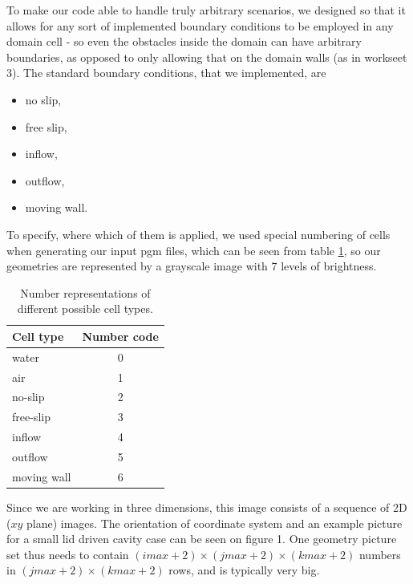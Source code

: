 \documentclass[a4paper, 12pt]{article}
\begin{document}
To make our code able to handle truly arbitrary scenarios, we designed so that it allows for any sort of implemented boundary conditions to be employed in any
domain cell - so even the obstacles inside the domain can have arbitrary boundaries, as opposed to only allowing that on the domain walls (as in workseet 3).
The standard boundary conditions, that we implemented, are
\begin{itemize}
\item no slip,
\item free slip,
\item inflow,
\item outflow,
\item moving wall.
\end{itemize}
To specify, where which of them is applied, we used special numbering of cells when generating our input pgm files, which can be seen from table
\ref{tab1}, so our geometries are represented by a grayscale image with 7 levels of brightness.
\begin{table}[hb!]
\centering
\label{tab1}
\begin{tabular}{|l|c|}
\hline
{\bf Cell type} & {\bf Number code}\\
\hline
water & 0 \\
air & 1 \\
no-slip & 2 \\
free-slip & 3 \\
inflow & 4 \\
outflow & 5 \\
moving wall & 6 \\
\hline
\end{tabular}
\caption{Number representations of different possible cell types.}
\end{table}
Since we are working in three dimensions, this image consists of a sequence of 2D ($xy$ plane) images. The orientation of coordinate system and an
example picture for a small lid driven cavity case can be seen on figure 1. One geometry picture set thus needs to contain
$(imax+2)\times(jmax+2)\times(kmax+2)$ numbers in $(jmax+2)\times(kmax+2)$ rows, and is typically very big.
\end{document}
